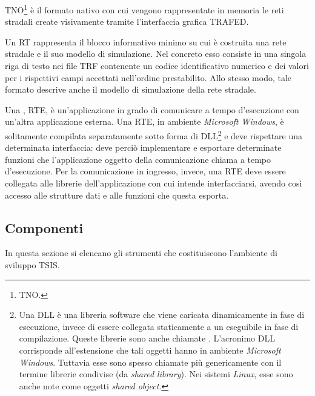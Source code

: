 \begin{definizione}\label{defn:tno-format}
\acs{TNO}\footnote{\acf{TNO}.} è il formato nativo con cui vengono rappresentate in memoria le reti stradali create visivamente tramite l'interfaccia grafica \acs{TRAFED}.
\end{definizione}

\begin{definizione}[\acl{RT}]\label{defn:tsis-rt}
Un \acf{RT} rappresenta il blocco informativo minimo su cui è costruita una rete stradale e il suo modello di simulazione. Nel concreto esso consiste in una singola riga di testo nei file \acs{TRF} contenente un codice identificativo numerico e dei valori per i rispettivi campi accettati nell'ordine prestabilito. Allo stesso modo, tale formato descrive anche il modello di simulazione della rete stradale.
\end{definizione}

\begin{definizione}\label{defn:rte}
Una , \acl{RTE}, è un'applicazione in grado di comunicare a tempo d'esecuzione con un'altra applicazione esterna. Una \acs{RTE}, in ambiente \emph{Microsoft Windows}, è solitamente compilata separatamente sotto forma di \acs{DLL}\footnote{Una \acf{DLL} è una libreria software che viene caricata dinamicamente in fase di esecuzione, invece di essere collegata staticamente a un eseguibile in fase di compilazione. Queste librerie sono anche chiamate . L'acronimo \acs{DLL} corrisponde all'estensione che tali oggetti hanno in ambiente \emph{Microsoft Windows}. Tuttavia esse sono spesso chiamate più genericamente con il termine librerie condivise (da \emph{shared library}). Nei sistemi \emph{Linux}, esse sono anche note come oggetti \emph{shared object}.} e deve rispettare una determinata interfaccia: deve perciò implementare e esportare determinate funzioni che l'applicazione oggetto della comunicazione chiama a tempo d'esecuzione. Per la comunicazione in ingresso, invece, una \acs{RTE} deve essere collegata alle librerie dell'applicazione con cui intende interfacciarsi, avendo così accesso alle strutture dati e alle funzioni che questa esporta.
\end{definizione}

\subsection{Componenti}\label{sec:tsis-components}
In questa sezione si elencano gli strumenti che costituiscono l'ambiente di sviluppo \acs{TSIS}.

